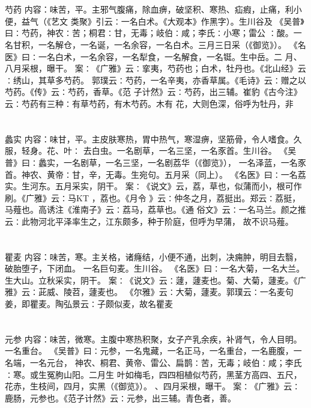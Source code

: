 \documentclass[12pt,UTF8]{ctexbook}
\begin{document}
\section{}芍药
内容：味苦，平。主邪气腹痛，除血痹，破坚积、寒热、疝瘕，止痛，利小便，益气（《艺文 
类聚》引云∶一名白术。《大观本》作黑字）。生川谷及 
《吴普》曰∶芍药，神农∶苦；桐君∶甘，无毒；岐伯∶咸；李氏∶小寒；雷公 
∶酸。一名甘积，一名解仓，一名诞，一名余容，一名白术。三月三日采（《御览》）。 
《名医》曰∶一名白术，一名余容，一名犁食，一名解食，一名铤。生中岳。二 
月、八月采根，曝干。 
案∶《广雅》云∶挛夷，芍药也；白术，牡丹也。《北山经》云∶绣山，其草多芍药。 
郭璞云∶芍药，一名辛夷，亦香草属。《毛诗》云∶赠之以芍药。《传》云∶芍药，香草。《范 
子计然》云∶芍药，出三辅。崔豹《古今注》云∶芍药有三种∶有草芍药，有木芍药。木有 
花，大则色深，俗呼为牡丹，非 


\section{}蠡实
内容：味甘，平。主皮肤寒热，胃中热气，寒湿痹，坚筋骨，令人嗜食。久服，轻身。花、叶∶ 
去白虫。一名剧草，一名三坚，一名豕首。生川谷。 
《吴普》曰∶蠡实，一名剧草，一名三坚，一名剧荔华（《御览》）， 
一名泽蓝，一名豕首。神农、黄帝∶甘，辛，无毒。生宛句。五月采（同上）。 
《名医》曰∶一名荔实。生河东。五月采实，阴干。 
案∶《说文》云，荔，草也，似蒲而小，根可作刷。《广雅》云∶马KT ，荔也。《月令 
》云∶仲冬之月，荔挺出。郑云∶荔挺，马薤也。高诱注《淮南子》云∶荔马，荔草也。《通 
俗文》云∶一名马兰。颜之推云∶此物河北平泽率生之，江东颇多，种于阶庭，但呼为早蒲， 
故不识马薤。 


\section{}瞿麦
内容：味苦，寒。主关格，诸癃结，小便不通，出刺，决痈肿，明目去翳，破胎堕子，下闭血。 
一名巨句麦。生川谷。 
《名医》曰∶一名大菊，一名大兰。生大山。立秋采实，阴干。 
案∶《说文》云∶蘧，蘧麦也。菊、大菊，蘧麦。《广雅》云∶茈威、陵苕，蘧麦也。 
《尔雅》云∶大菊，蘧麦。郭璞云∶一名麦句姜，即瞿麦。陶弘景云∶子颇似麦，故名瞿麦 


\section{}元参
内容：味苦，微寒。主腹中寒热积聚，女子产乳余疾，补肾气，令人目明。一名重台。 
《吴普》曰∶元参，一名鬼藏，一名正马，一名重台，一名鹿腹，一名端，一名元台， 
神农、桐君、黄帝、雷公、扁鹊∶苦，无毒；岐伯∶咸；李氏∶寒。或生冤朐山阳。二月生 
叶如梅毛，四四相植似芍药，黑茎方高四、五尺，花赤，生枝间，四月，实黑（《御览》）。 
、四月采根，曝干。 
案∶《广雅》云∶鹿肠，元参也。《范子计然》云∶元参，出三辅。青色者，善。 
\end{document}
